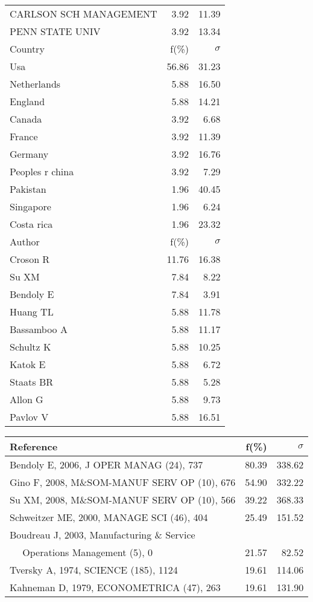 \documentclass[a4paper,11pt]{report}
\begin{document}
\begin{landscape}
\begin{table}[!ht]
{\begin{tabular}{|l r r|}
CARLSON SCH MANAGEMENT & 3.92 & 11.39\\
PENN STATE UNIV & 3.92 & 13.34\\
\hline
\hline
Country & f(\%) & $\sigma$\\
\hline
Usa & 56.86 & 31.23\\
Netherlands & 5.88 & 16.50\\
England & 5.88 & 14.21\\
Canada & 3.92 & 6.68\\
France & 3.92 & 11.39\\
Germany & 3.92 & 16.76\\
Peoples r china & 3.92 & 7.29\\
Pakistan & 1.96 & 40.45\\
Singapore & 1.96 & 6.24\\
Costa rica & 1.96 & 23.32\\
\hline
\hline
Author & f(\%) & $\sigma$\\
\hline
Croson R & 11.76 & 16.38\\
Su XM & 7.84 & 8.22\\
Bendoly E & 7.84 & 3.91\\
Huang TL & 5.88 & 11.78\\
Bassamboo A & 5.88 & 11.17\\
Schultz K & 5.88 & 10.25\\
Katok E & 5.88 & 6.72\\
Staats BR & 5.88 & 5.28\\
Allon G & 5.88 & 9.73\\
Pavlov V & 5.88 & 16.51\\
\hline
\end{tabular}
}
{\scriptsize\begin{tabular}{|l r r|}
\hline
Reference & f(\%) & $\sigma$\\
\hline
Bendoly E, 2006, J OPER MANAG (24), 737 & 80.39 & 338.62\\
Gino F, 2008, M\&SOM-MANUF SERV OP (10), 676 & 54.90 & 332.22\\
Su XM, 2008, M\&SOM-MANUF SERV OP (10), 566 & 39.22 & 368.33\\
Schweitzer ME, 2000, MANAGE SCI (46), 404 & 25.49 & 151.52\\
Boudreau J, 2003, Manufacturing \& Service &  & \\
$\quad$ Operations Management (5), 0 & 21.57 & 82.52\\
Tversky A, 1974, SCIENCE (185), 1124 & 19.61 & 114.06\\
Kahneman D, 1979, ECONOMETRICA (47), 263 & 19.61 & 131.90\\

\end{tabular}}
\end{table}
\end{landscape}
\end{document}
